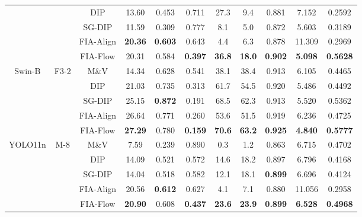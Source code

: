 \begin{table}[t]
\begin{tabular}{ccccccccccc}
 & & DIP & 13.60 & 0.453 & 0.711 &27.3 & 9.4 &0.881 &7.152 & 0.2592 \\
  & & SG-DIP &11.59 &0.309 &0.777  & 8.1&5.0 &0.872&5.603 &0.3189 \\
   & & FIA-Align & \textbf{20.36} & \textbf{0.603} & 0.643  &4.4&6.3&0.878 & 11.309 &0.2969\\
 & & \cellcolor{myhighlight}FIA-Flow & \cellcolor{myhighlight}20.31 & \cellcolor{myhighlight}0.584 & \cellcolor{myhighlight}\textbf{0.397} & \cellcolor{myhighlight}\textbf{36.8} & \cellcolor{myhighlight}\textbf{18.0} & \cellcolor{myhighlight}\textbf{0.902} & \cellcolor{myhighlight}\textbf{5.098} & \cellcolor{myhighlight}\textbf{0.5628} \\
 \midrule
 \multirow{5}{*}{Swin-B}& \multirow{5}{*}{F3-2} & M\&V &14.34 &0.628 &0.541  & 38.1& 38.4& 0.913&6.105 & 0.4465\\
 & & DIP & 21.03&0.735 &0.313  & 61.7& 54.5&0.920 &5.486 &0.4492 \\
  & & SG-DIP&25.15 &\textbf{0.872} &0.191  & 68.5&62.3 & 0.913&5.520 &0.5362 \\
  & & FIA-Align & 26.64& 0.771&0.260  & 53.6& 51.5&0.919 &6.236 &0.4725 \\
   & & \cellcolor{myhighlight}FIA-Flow &
    \cellcolor{myhighlight}\textbf{27.29} &
    \cellcolor{myhighlight}0.780 &
    \cellcolor{myhighlight}\textbf{0.159} &
    \cellcolor{myhighlight}\textbf{70.6} &
    \cellcolor{myhighlight}\textbf{63.2} &
    \cellcolor{myhighlight}\textbf{0.925} &
    \cellcolor{myhighlight}\textbf{4.840} &
    \cellcolor{myhighlight}\textbf{0.5777} \\
\midrule
  \multirow{5}{*}{YOLO11n}& \multirow{5}{*}{M-8} & M\&V &7.59 &0.239 &0.890 &0.3 & 1.2& 0.863&6.715 & 0.4702\\
 & & DIP & 14.09&0.521 &0.572 & 14.6& 18.2&0.897 & 6.796&0.4168 \\
  & & SG-DIP& 14.04&0.518 &0.582 & 12.1& 18.1& \textbf{0.899}&6.696 &0.4124 \\
  & & FIA-Align &20.56 &\textbf{0.612} &0.627 & 4.1& 7.1&0.880 &11.056 & 0.2958\\
   & & \cellcolor{myhighlight}FIA-Flow &
    \cellcolor{myhighlight}\textbf{20.90} &
    \cellcolor{myhighlight}0.608&
    \cellcolor{myhighlight}\textbf{0.437} &
    \cellcolor{myhighlight}\textbf{23.6} &
    \cellcolor{myhighlight}\textbf{23.9} &
    \cellcolor{myhighlight}\textbf{0.899} &
    \cellcolor{myhighlight}\textbf{6.528} &
    \cellcolor{myhighlight}\textbf{0.4968} \\
    \midrule

\end{tabular}
\end{table}
